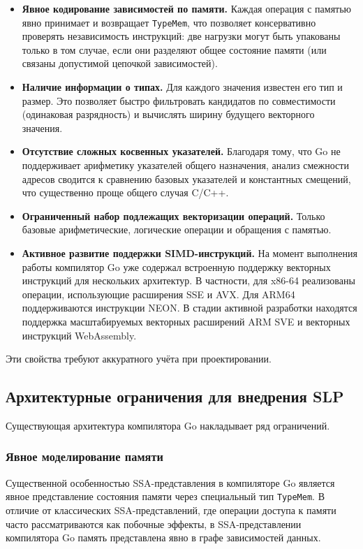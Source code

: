 \begin{itemize}
    \item \textbf{Явное кодирование зависимостей по памяти.} Каждая операция с памятью явно принимает и возвращает 
    \texttt{TypeMem}, что позволяет консервативно проверять независимость инструкций: две нагрузки могут 
    быть упакованы только в том случае, если они разделяют общее состояние памяти (или связаны допустимой цепочкой зависимостей).
    \item \textbf{Наличие информации о типах.} Для каждого значения известен его тип и размер.
    Это позволяет быстро фильтровать кандидатов по совместимости (одинаковая разрядность) и вычислять ширину будущего векторного значения.
    \item \textbf{Отсутствие сложных косвенных указателей.} Благодаря тому, что Go не поддерживает арифметику
    указателей общего назначения, анализ смежности адресов сводится к сравнению базовых указателей и константных смещений,
    что существенно проще общего случая C/C++.
    \item \textbf{Ограниченный набор подлежащих векторизации операций.} Только базовые арифметические,
    логические операции и обращения с памятью.
    \item \textbf{Активное развитие поддержки SIMD-инструкций.} На момент выполнения работы компилятор Go
    уже содержал встроенную поддержку векторных инструкций для нескольких архитектур.
    В частности, для x86-64 реализованы операции, использующие расширения SSE и AVX.
    Для ARM64 поддерживаются инструкции NEON.
    В стадии активной разработки находятся поддержка масштабируемых векторных расширений ARM SVE и векторных инструкций WebAssembly.
\end{itemize}

Эти свойства требуют аккуратного учёта при проектировании.

\subsection{Архитектурные ограничения для внедрения SLP}
\label{sec:go_limitations2}

Существующая архитектура компилятора Go накладывает ряд ограничений.

\subsubsection{Явное моделирование памяти}

Существенной особенностью SSA-представления в компиляторе Go является явное представление состояния памяти через специальный тип \texttt{TypeMem}. 
В отличие от классических SSA-представлений, где операции доступа к памяти часто рассматриваются как побочные эффекты, 
в SSA-представлении компилятора Go память представлена явно в графе зависимостей данных.

